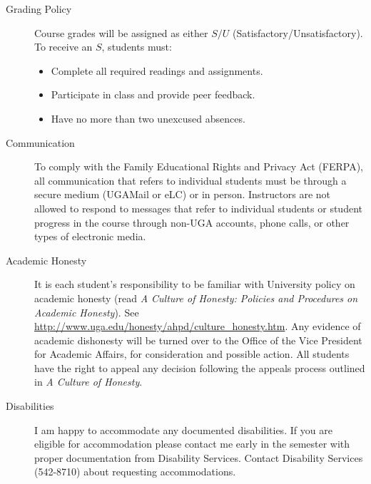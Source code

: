 \documentclass[11pt, a4paper]{article}
\begin{document}
\begin{description}
\item[Grading Policy] Course grades will be assigned as either $S/U$
  (Satisfactory/Unsatisfactory). To receive an $S$, students must:
  \begin{itemize}
  \item Complete all required readings and assignments.
  \item Participate in class and provide peer feedback.
  \item Have no more than two unexcused absences.
  \end{itemize}


\item[Communication] To comply with the Family Educational Rights and
  Privacy Act (FERPA), all communication that refers to individual
  students must be through a secure medium (UGAMail or eLC) or in
  person. Instructors are not allowed to respond to messages that
  refer to individual students or student progress in the course
  through non-UGA accounts, phone calls, or other types of electronic
  media.


\item[Academic Honesty] It is each student’s responsibility to be
  familiar with University policy on academic honesty (read \textit{A
    Culture of Honesty: Policies and Procedures on Academic
    Honesty}). See
  \href{http://www.uga.edu/honesty/ahpd/culture_honesty.htm}{\url{http://www.uga.edu/honesty/ahpd/culture_honesty.htm}}. Any
  evidence of academic dishonesty will be turned over to the Office of
  the Vice President for Academic Affairs, for consideration and
  possible action.  All students have the right to appeal any decision
  following the appeals process outlined in \textit{A Culture of
    Honesty}.


\item[Disabilities] I am happy to accommodate any documented
  disabilities.  If you are eligible for accommodation please contact
  me early in the semester with proper documentation from Disability
  Services.  Contact Disability Services (542-8710) about requesting
  accommodations.



\end{description}
\end{document}
